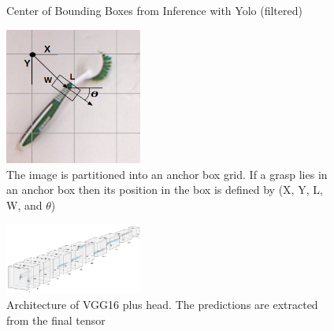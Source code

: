 \documentclass{article}
\begin{document}
\begin{figure}
\centering
{}
\qquad
{}
\caption{Center of Bounding Boxes from Inference with Yolo (filtered)}
\label{fig:obj_det}
\end{figure}

\begin{figure}
\centering
\includegraphics[width=0.4\textwidth]{figures/example_anchor_box.png}
\caption{The image is partitioned into an anchor box grid. If a grasp lies in an anchor box then its position in the box is defined by (X, Y, L, W, and $\theta$)}
\label{fig:example}
\end{figure}

\begin{figure}
\centering
\includegraphics[width=0.4\textwidth]{figures/nn.png}
\caption{Architecture of VGG16 plus head. The predictions are extracted from the final tensor}
\label{fig:nn}
\end{figure}
\end{document}
